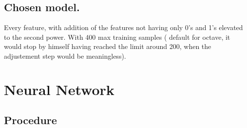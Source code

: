 \documentclass{article}
\begin{document}
\subsection{Chosen model.}
Every feature, with addition of the features not having only 0's and 1's elevated to the second power. With 400 max training samples ( default for octave, it would stop by himself having reached the limit around 200, when the adjustement step would be meaningless). 

\newpage

\section{Neural Network}

\subsection{Procedure}
\end{document}
